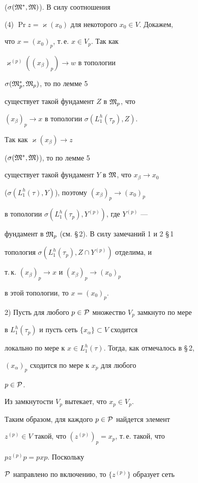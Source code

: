 \begin{pf}
($\sigma ({\frak M}^*, {\frak M})$). В силу соотношения 


(4)\; $\Pr z=\varkappa (x_0)$ для некоторого $x_0 \in V$. Докажем, 


что $x=(x_0)_p$, т.\,е. $x \in V_p$. Так как 


$\varkappa^{(p)} ((x_{\beta})_p) \to w$ в топологии


$\sigma ({\frak M}_p^*, {\frak M}_p)$, то по лемме 5


существует такой фундамент $Z$ в ${\frak M}_p$, что 


$(x_{\beta})_p \to x$ в топологии $\sigma (L_1^h (\tau_p), Z)$. 


Так как $\varkappa (x_{\beta}) \to z$ 


($\sigma ({\frak M}^*, {\frak M})$), то по лемме 5 


существует такой фундамент $Y$ в $\frak M$, что $x_{\beta} \to x_0$ 


($\sigma (L_1^h (\tau), Y)$), поэтому $(x_{\beta})_p \to (x_0)_p$


в топологии $\sigma (L_1^h (\tau_p), Y^{(p)})$, где $Y^{(p)}$ --- 


фундамент в ${\frak M}_p$ (см. \S\,2). В силу замечаний 1 и 2 \S\,1 


топология $\sigma (L_1^h (\tau_p), Z \cap Y^{(p)})$ отделима, и 


т.\,к. $(x_{\beta})_p \to x$ и $(x_{\beta})_p \to (x_0)_p$ 


в этой топологии, то $x=(x_0)_p$. 


\smallskip





2) Пусть для любого $p \in {\cal P}$ множество $V_p$ замкнуто по мере 


в $L_1^h (\tau_p)$ и пусть сеть $\{x_{\alpha}\} \subset V$ сходится 


локально по мере к $x \in L_1^h (\tau)$. Тогда, как отмечалось в \S\,2, 


$(x_{\alpha})_p$ сходится по мере к $x_p$ для любого 


$p \in {\cal P}$. 


Из замкнутости $V_p$ вытекает, что $x_p \in V_p$. 


Таким образом, для каждого $p \in {\cal P}$ найдется элемент 


$z^{(p)} \in V$ такой, что $(z^{(p)})_p=x_p$, т.\,е. такой, что


$p z^{(p)} p=pxp$. Поскольку 


${\cal P}$ направлено по включению, то $\{z^{(p)}\}$ образует сеть 



\end{pf}

